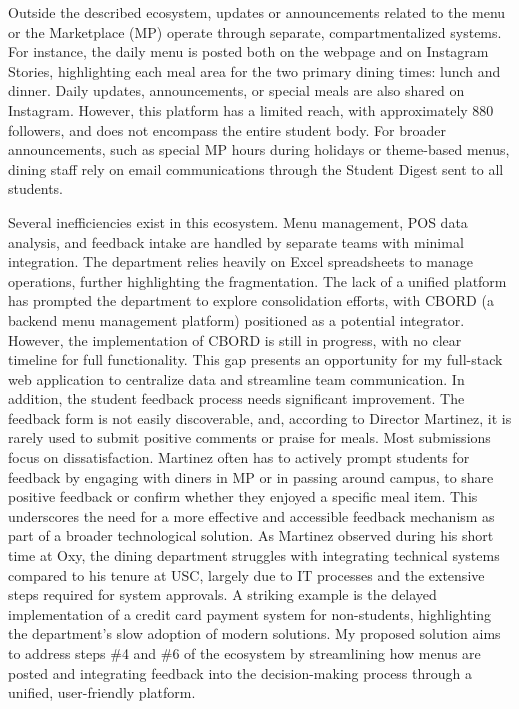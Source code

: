\documentclass[10pt,twocolumn]{article}
\begin{document}
Outside the described ecosystem, updates or announcements related to the menu or the Marketplace (MP) operate through separate, compartmentalized systems. For instance, the daily menu is posted both on the webpage and on Instagram Stories, highlighting each meal area for the two primary dining times: lunch and dinner. Daily updates, announcements, or special meals are also shared on Instagram. However, this platform has a limited reach, with approximately 880 followers, and does not encompass the entire student body. For broader announcements, such as special MP hours during holidays or theme-based menus, dining staff rely on email communications through the Student Digest sent to all students.

Several inefficiencies exist in this ecosystem. Menu management, POS data analysis, and feedback intake are handled by separate teams with minimal integration. The department relies heavily on Excel spreadsheets to manage operations, further highlighting the fragmentation. The lack of a unified platform has prompted the department to explore consolidation efforts, with CBORD (a backend menu management platform) positioned as a potential integrator. However, the implementation of CBORD is still in progress, with no clear timeline for full functionality. This gap presents an opportunity for my full-stack web application to centralize data and streamline team communication. In addition, the student feedback process needs significant improvement. The feedback form is not easily discoverable, and, according to Director Martinez, it is rarely used to submit positive comments or praise for meals. Most submissions focus on dissatisfaction. Martinez often has to actively prompt students for feedback by engaging with diners in MP or in passing around campus, to share positive feedback or confirm whether they enjoyed a specific meal item. This underscores the need for a more effective and accessible feedback mechanism as part of a broader technological solution. As Martinez observed during his short time at Oxy, the dining department struggles with integrating technical systems compared to his tenure at USC, largely due to IT processes and the extensive steps required for system approvals. A striking example is the delayed implementation of a credit card payment system for non-students, highlighting the department's slow adoption of modern solutions. My proposed solution aims to address steps \#4 and \#6 of the ecosystem by streamlining how menus are posted and integrating feedback into the decision-making process through a unified, user-friendly platform.
\end{document}
